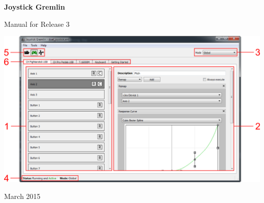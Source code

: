 \begin{titlepage}
\begin{center}
	\vspace*{\fill}
	\vspace*{-3cm}
    \begin{Huge}
        \textbf{Joystick Gremlin}
    \end{Huge}

    \vspace{1cm}

    \begin{Large}
        {Manual for Release 3}
    \end{Large}

    \vspace{3cm}

    \includegraphics[width=0.9\linewidth]{images/main_window}

    \vspace{6.0cm}

	March 2015
\vspace*{\fill}
\end{center}
\end{titlepage}
